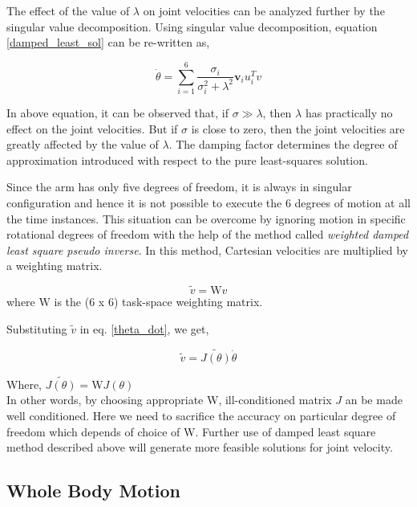 The effect of the value of $\lambda$ on joint velocities can be analyzed further by the singular value decomposition. Using singular value decomposition, equation \ref{damped_least_sol} can be re-written as,

\begin{equation}
\dot{\theta} = \sum_{i=1}^{6}\frac{\sigma_{i}}{\sigma_{i}^{2} + \lambda^{2} }\textbf{v}_{i}u_{i}^{T}v
\end{equation} 

In above equation, it can be observed that, if $\sigma \gg \lambda$, then $\lambda$ has practically no effect on the joint velocities. But if $\sigma$ is close to zero, then the joint velocities are greatly affected by the value of $\lambda$. The damping factor determines the degree of approximation introduced with respect to the pure least-squares solution.

Since the arm has only five degrees of freedom, it is always in singular configuration and hence it is not possible to execute the 6 degrees of motion at all the time instances. This situation can be overcome by ignoring motion in specific rotational degrees of freedom with the help of the method called \textit{weighted damped least square pseudo inverse}. In this method, Cartesian velocities are multiplied by a weighting matrix. 

\begin{equation}
	\tilde{v} = \text{W}v
\end{equation}
where $\text{W}$ is the (6 x 6) task-space weighting matrix\cite{wampler1986manipulator}.

Substituting $\tilde{v}$ in eq. \ref{theta_dot}, we get,

\begin{equation}
\tilde{v} = \tilde{J(\theta)}\dot{\theta} 
\end{equation}

Where, $\tilde{J(\theta)} = \text{W}J(\theta)$ \\

In other words, by choosing appropriate W, ill-conditioned matrix $J$ an be made well conditioned. Here we need to sacrifice the accuracy on particular degree of freedom which depends of choice of W. Further use of damped least square method described above will generate more feasible solutions for joint velocity. 

\subsection{Whole Body Motion}\label{whole_body_motion}

